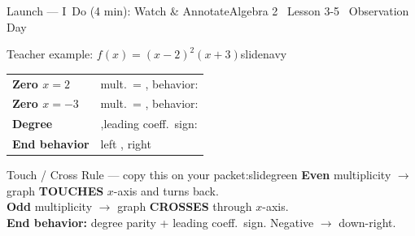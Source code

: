 \documentclass[aspectratio=169, 11pt]{beamer}
\begin{document}
\begin{frame}{Launch --- I~Do (4 min): Watch \& Annotate}{Algebra 2 \textperiodcentered\ Lesson 3-5 \textperiodcentered\ Observation Day}
\vspace{0.1cm}
\begin{projcard}{Teacher example: $f(x) = (x-2)^2(x+3)$}{slidenavy}
\begin{tabular}{p{1.5in}p{3.0in}}
\textbf{Zero $x = 2$} & mult.\ = \underline{\hspace{0.6cm}}, behavior: \underline{\hspace{1.8cm}} \\[6pt]
\textbf{Zero $x = -3$} & mult.\ = \underline{\hspace{0.6cm}}, behavior: \underline{\hspace{1.8cm}} \\[6pt]
\textbf{Degree} & \underline{\hspace{0.6cm}},\quad leading coeff.\ sign: \underline{\hspace{1.3cm}} \\[6pt]
\textbf{End behavior} & left \underline{\hspace{1.2cm}}, right \underline{\hspace{1.2cm}} \\
\end{tabular}
\end{projcard}
\vspace{0.05cm}
\begin{projcard}{Touch / Cross Rule --- copy this on your packet:}{slidegreen}
\textbf{Even} multiplicity $\rightarrow$ graph \textbf{TOUCHES} $x$-axis and turns back. \\
\textbf{Odd} multiplicity $\rightarrow$ graph \textbf{CROSSES} through $x$-axis. \\
\textbf{End behavior:} degree parity + leading coeff.\ sign. Negative $\rightarrow$ down-right.
\end{projcard}
\end{frame}
\end{document}
